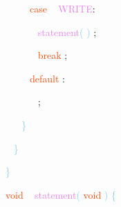 \documentclass[8, usernames, dvipsnames]{beamer}
\begin{document}
\begin{frame}
\textcolor{White}{\   }
\textcolor{White}{\   }
\textcolor{White}{\   }
\textcolor{OrangeRed}{case}
\textcolor{White}{\ }
\textcolor{Violet}{WRITE}\textcolor{Sepia}{:}

 \textcolor{White}{\   }
\textcolor{White}{\   }
\textcolor{White}{\   }
\textcolor{White}{\   }
\textcolor{Violet}{statement}\textcolor{SkyBlue}{(}
\textcolor{SkyBlue}{)}
\textcolor{Sepia}{;}

 \textcolor{White}{\   }
\textcolor{White}{\   }
\textcolor{White}{\   }
\textcolor{White}{\   }
\textcolor{OrangeRed}{break}
\textcolor{Sepia}{;}

 \textcolor{White}{\   }
\textcolor{White}{\   }
\textcolor{White}{\   }
\textcolor{OrangeRed}{default}
\textcolor{Sepia}{:}

 \textcolor{White}{\   }
\textcolor{White}{\   }
\textcolor{White}{\   }
\textcolor{White}{\   }
\textcolor{OrangeRed}{	}
\textcolor{Sepia}{;}

 \textcolor{White}{\   }
\textcolor{White}{\   }
\textcolor{SkyBlue}{\} }

 \textcolor{White}{\   }
\textcolor{SkyBlue}{\} }

 \textcolor{SkyBlue}{\} }

 
 \textcolor{OrangeRed}{void}
\textcolor{White}{\ }
\textcolor{Violet}{statement}\textcolor{SkyBlue}{(}
\textcolor{OrangeRed}{void}
\textcolor{SkyBlue}{)}
\textcolor{SkyBlue}{\{ }

 \end{frame}
\end{document}
